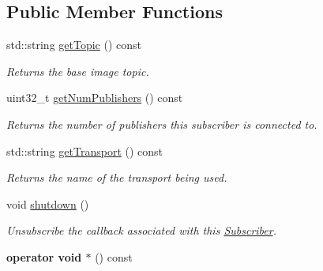 \subsection*{Public Member Functions}
\begin{DoxyCompactItemize}
\item 
std\-::string \hyperlink{classimage__transport_1_1_subscriber_ae8d6676e24bb42dd4b57484db5770c1b}{get\-Topic} () const 
\begin{DoxyCompactList}\small\item\em Returns the base image topic. \end{DoxyCompactList}\item 
\hypertarget{classimage__transport_1_1_subscriber_ac5b0836c603afc1faa961bbf279e48da}{uint32\-\_\-t \hyperlink{classimage__transport_1_1_subscriber_ac5b0836c603afc1faa961bbf279e48da}{get\-Num\-Publishers} () const }\label{classimage__transport_1_1_subscriber_ac5b0836c603afc1faa961bbf279e48da}

\begin{DoxyCompactList}\small\item\em Returns the number of publishers this subscriber is connected to. \end{DoxyCompactList}\item 
\hypertarget{classimage__transport_1_1_subscriber_ac1b8ae33bf243c09e33e293330a2a4b7}{std\-::string \hyperlink{classimage__transport_1_1_subscriber_ac1b8ae33bf243c09e33e293330a2a4b7}{get\-Transport} () const }\label{classimage__transport_1_1_subscriber_ac1b8ae33bf243c09e33e293330a2a4b7}

\begin{DoxyCompactList}\small\item\em Returns the name of the transport being used. \end{DoxyCompactList}\item 
\hypertarget{classimage__transport_1_1_subscriber_a014af7126efc24adf6dc4d11ac9bca6b}{void \hyperlink{classimage__transport_1_1_subscriber_a014af7126efc24adf6dc4d11ac9bca6b}{shutdown} ()}\label{classimage__transport_1_1_subscriber_a014af7126efc24adf6dc4d11ac9bca6b}

\begin{DoxyCompactList}\small\item\em Unsubscribe the callback associated with this \hyperlink{classimage__transport_1_1_subscriber}{Subscriber}. \end{DoxyCompactList}\item 
\hypertarget{classimage__transport_1_1_subscriber_a23659b0b3552134bf47af54e847b6063}{{\bfseries operator void $\ast$} () const }\label{classimage__transport_1_1_subscriber_a23659b0b3552134bf47af54e847b6063}


\end{DoxyCompactItemize}
